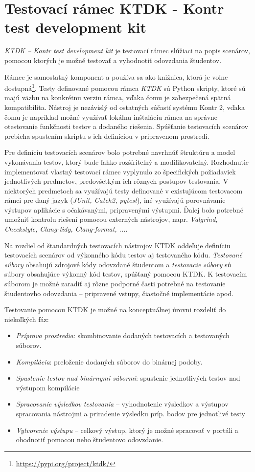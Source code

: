 \documentclass[
  digital, %
  twoside, %
  table,   %
  lof,     %
  lot,     %
]{fithesis3}
\begin{document}
\section{Testovací rámec KTDK - Kontr test development kit}

\emph{KTDK -- Kontr test development kit} je testovací rámec slúžiaci na popis scenárov, pomocou ktorých je možné testovať a vyhodnotiť odovzdania študentov.

Rámec je samostatný komponent a používa sa ako knižnica, ktorá je voľne dostupná\footnote{\url{https://pypi.org/project/ktdk/}}. Testy definované pomocou rámca \emph{KTDK} sú Python skripty, ktoré sú majú väzbu na konkrétnu verziu rámca, vďaka čomu je zabezpečená spätná kompatibilita. Nástroj je nezávislý od ostatných súčastí systému Kontr 2, vďaka čomu je napríklad možné využívať lokálnu inštaláciu rámca na správne otestovanie funkčnosti testov a dodaného riešenia. Spúšťanie testovacích scenárov prebieha spustením skriptu s ich definíciou v pripravenom prostredí. %

Pre definíciu testovacích scenárov bolo potrebné navrhnúť štruktúru a model vykonávania testov, ktorý bude ľahko rozšíriteľný a modifikovateľný. Rozhodnutie implementovať vlastný testovací rámec vyplynulo zo špecifických požiadaviek jednotlivých predmetov, predovšetkým ich rôznych postupov testovania. V niektorých predmetoch sa využívajú testy definované v existujúcom testovacom rámci pre daný jazyk (\emph{JUnit, Catch2, pytest}), iné využívajú porovnávanie výstupov aplikácie s očakávanými, pripravenými výstupmi. Ďalej bolo potrebné umožniť kontrolu riešení pomocou externých nástrojov, napr. \emph{Valgrind, Checkstyle, Clang-tidy, Clang-format, ...}.

Na rozdiel od štandardných testovacích nástrojov KTDK oddeľuje definíciu testovacích scenárov od výkonného kódu testov aj testovaného kódu. \emph{Testované súbory} obsahujú zdrojové kódy odovzdané študentom a \emph{testovacie súbory} sú súbory obsahujúce výkonný kód testov, spúšťaný pomocou KTDK. K testovacím súborom je možné zaradiť aj rôzne podporné časti potrebné na testovanie študentovho odovzdania -- pripravené vstupy, čiastočné implementácie apod.

Testovanie pomocou KTDK je možné na konceptuálnej úrovni rozdeliť do niekoľkých fáz:
\begin{itemize}
    \item \emph{Príprava prostredia}: skombinovanie dodaných testovacích a testovaných súborov.
    \item \emph{Kompilácia}: preloženie dodaných súborov do binárnej podoby.
    \item \emph{Spustenie testov nad binárnymi súbormi}: spustenie jednotlivých testov nad výstupom kompilácie
    \item \emph{Spracovanie výsledkov testovania} -- vyhodnotenie výsledkov a výstupov spracovania nástrojmi a priradenie výsledku príp. bodov pre jednotlivé testy
    \item \emph{Vytvorenie výstupu} -- celkový výstup, ktorý je možné spracovať v portáli a ohodnotiť pomocou neho študentovo odovzdanie.
\end{itemize}
\end{document}
